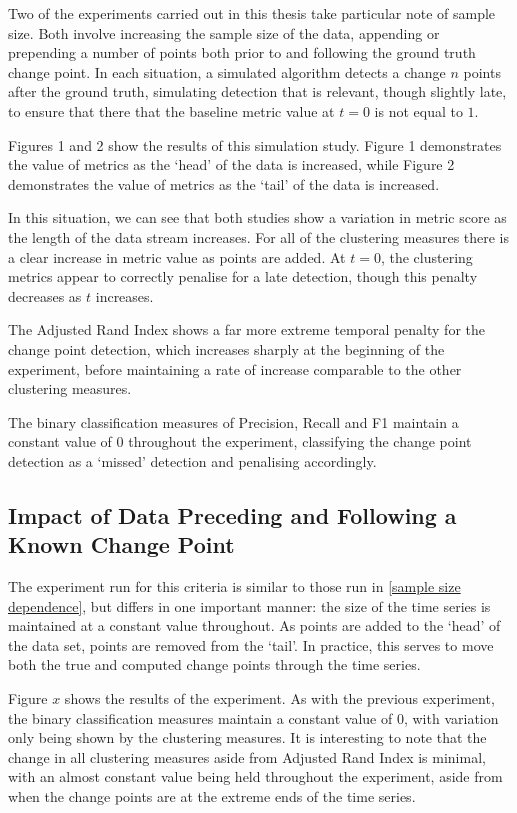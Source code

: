 \documentclass{uvamscse}	%
\begin{document}
Two of the experiments carried out in this thesis take particular note of sample size. Both involve increasing the sample size of the data, appending or prepending a number of points both prior to and following the ground truth change point. In each situation, a simulated algorithm detects a change $n$ points after the ground truth, simulating detection that is relevant, though slightly late, to ensure that there that the baseline metric value at $t = 0$ is not equal to $1$.


Figures 1 and 2 show the results of this simulation study. Figure 1 demonstrates the value of metrics as the `head' of the data is increased, while Figure 2 demonstrates the value of metrics as the `tail' of the data is increased.

In this situation, we can see that both studies show a variation in metric score as the length of the data stream increases. For all of the clustering measures there is a clear increase in metric value as points are added. At $t=0$, the clustering metrics appear to correctly penalise for a late detection, though this penalty decreases as $t$ increases.

The Adjusted Rand Index shows a far more extreme temporal penalty for the change point detection, which increases sharply at the beginning of the experiment, before maintaining a rate of increase comparable to the other clustering measures.

The binary classification measures of Precision, Recall and F1 maintain a constant value of $0$ throughout the experiment, classifying the change point detection as a `missed' detection and penalising accordingly.

\subsection{Impact of Data Preceding and Following a Known Change Point}

The experiment run for this criteria is similar to those run in \autoref{sample size dependence}, but differs in one important manner: the size of the time series is maintained at a constant value throughout. As points are added to the `head' of the data set, points are removed from the `tail'. In practice, this serves to move both the true and computed change points through the time series.


Figure $x$ shows the results of the experiment. As with the previous experiment, the binary classification measures maintain a constant value of $0$, with variation only being shown by the clustering measures. It is interesting to note that the change in all clustering measures aside from Adjusted Rand Index is minimal, with an almost constant value being held throughout the experiment, aside from when the change points are at the extreme ends of the time series.
\end{document}
